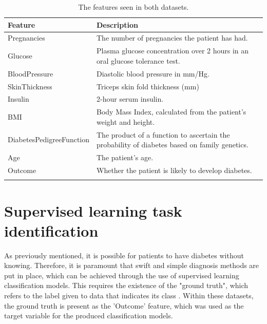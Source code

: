 \documentclass[12pt]{report}
\begin{document}
\begin{longtable}{ | p{} | p{} | }
    \hline
    \cellcolor{blue!25}Feature & \cellcolor{blue!25}Description \\
    \hline
    Pregnancies & The number of pregnancies the patient has had. \\
    \hline
    Glucose & Plasma glucose concentration over 2 hours in an oral glucose tolerance test. \\
    \hline
    BloodPressure & Diastolic blood pressure in mm/Hg. \\
    \hline
    SkinThickness & Triceps skin fold thickness (mm) \\
    \hline
    Insulin & 2-hour serum insulin. \\
    \hline
    BMI & Body Mass Index, calculated from the patient's weight and height. \\
    \hline
    DiabetesPedigreeFunction & The product of a function to ascertain the probability of diabetes based on family genetics. \autocite{akmese_diagnosing_2022} \\
    \hline
    Age & The patient's age.\\
    \hline
    Outcome & Whether the patient is likely to develop diabetes.\\
    \hline 
    \caption{The features seen in both datasets.}\label{tab:Features}
\end{longtable}


\section{Supervised learning task identification}
As previously mentioned, it is possible for patients to have diabetes without knowing. Therefore,
it is paramount that swift and simple diagnosis methods are put in place, which can be achieved 
through the use of supervised learning classification models. This requires the existence of the 
"ground truth", which refers to the label given to data that indicates its class \autocite{c3ai_what_nodate}. 
Within these datasets, the ground truth is present as the 'Outcome' feature, which was used 
as the target variable for the produced classification models.
\end{document}
